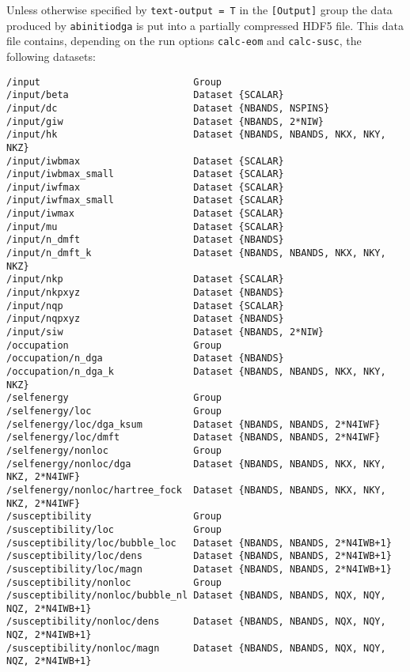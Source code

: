 \documentclass[a4paper,11pt]{article}
\numberwithin{equation}{section} %
\begin{document}
\newpage
Unless otherwise specified by \verb|text-output = T| in the {\color{red}\verb|[Output]|} group the data produced by \verb+abinitiodga+ is put into a partially compressed HDF5 file. This data file contains, depending on the run options \verb|calc-eom| and \verb|calc-susc|, the following datasets:

\begin{lstlisting}[caption=ADGA HDF5 output format for a q-grid, frame=single, basicstyle=\small]
/input                           Group
/input/beta                      Dataset {SCALAR}
/input/dc                        Dataset {NBANDS, NSPINS}
/input/giw                       Dataset {NBANDS, 2*NIW}
/input/hk                        Dataset {NBANDS, NBANDS, NKX, NKY, NKZ}
/input/iwbmax                    Dataset {SCALAR}
/input/iwbmax_small              Dataset {SCALAR}
/input/iwfmax                    Dataset {SCALAR}
/input/iwfmax_small              Dataset {SCALAR}
/input/iwmax                     Dataset {SCALAR}
/input/mu                        Dataset {SCALAR}
/input/n_dmft                    Dataset {NBANDS}
/input/n_dmft_k                  Dataset {NBANDS, NBANDS, NKX, NKY, NKZ}
/input/nkp                       Dataset {SCALAR}
/input/nkpxyz                    Dataset {NBANDS}
/input/nqp                       Dataset {SCALAR}
/input/nqpxyz                    Dataset {NBANDS}
/input/siw                       Dataset {NBANDS, 2*NIW}
/occupation                      Group
/occupation/n_dga                Dataset {NBANDS}
/occupation/n_dga_k              Dataset {NBANDS, NBANDS, NKX, NKY, NKZ}
/selfenergy                      Group
/selfenergy/loc                  Group
/selfenergy/loc/dga_ksum         Dataset {NBANDS, NBANDS, 2*N4IWF}
/selfenergy/loc/dmft             Dataset {NBANDS, NBANDS, 2*N4IWF}
/selfenergy/nonloc               Group
/selfenergy/nonloc/dga           Dataset {NBANDS, NBANDS, NKX, NKY, NKZ, 2*N4IWF}
/selfenergy/nonloc/hartree_fock  Dataset {NBANDS, NBANDS, NKX, NKY, NKZ, 2*N4IWF}
/susceptibility                  Group
/susceptibility/loc              Group
/susceptibility/loc/bubble_loc   Dataset {NBANDS, NBANDS, 2*N4IWB+1}
/susceptibility/loc/dens         Dataset {NBANDS, NBANDS, 2*N4IWB+1}
/susceptibility/loc/magn         Dataset {NBANDS, NBANDS, 2*N4IWB+1}
/susceptibility/nonloc           Group
/susceptibility/nonloc/bubble_nl Dataset {NBANDS, NBANDS, NQX, NQY, NQZ, 2*N4IWB+1}
/susceptibility/nonloc/dens      Dataset {NBANDS, NBANDS, NQX, NQY, NQZ, 2*N4IWB+1}
/susceptibility/nonloc/magn      Dataset {NBANDS, NBANDS, NQX, NQY, NQZ, 2*N4IWB+1}
\end{lstlisting}
\end{document}
